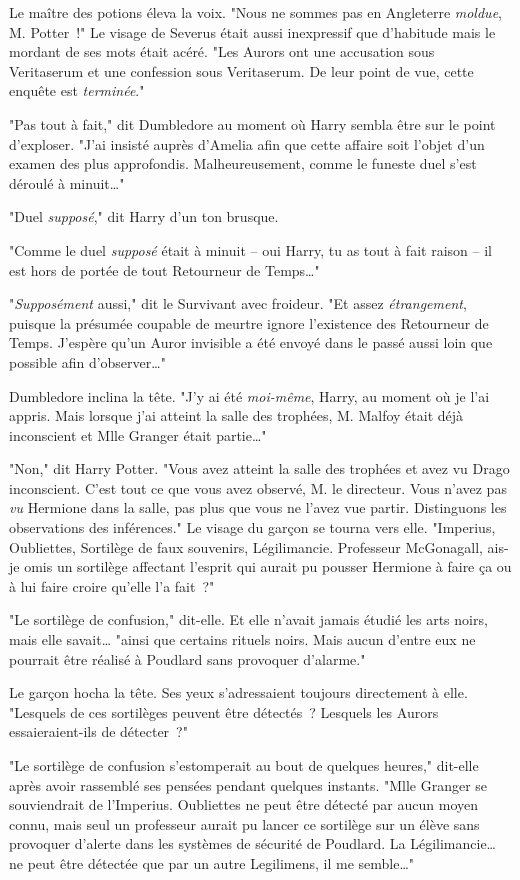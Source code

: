 Le maître des potions éleva la voix. "Nous ne sommes pas en Angleterre \emph{moldue}, M. Potter~!" Le visage de Severus était aussi inexpressif que d'habitude mais le mordant de ses mots était acéré. "Les Aurors ont une accusation sous Veritaserum et une confession sous Veritaserum. De leur point de vue, cette enquête est \emph{terminée}."

"Pas tout à fait," dit Dumbledore au moment où Harry sembla être sur le point d'exploser. "J'ai insisté auprès d'Amelia afin que cette affaire soit l'objet d'un examen des plus approfondis. Malheureusement, comme le funeste duel s'est déroulé à minuit…"

"Duel \emph{supposé}," dit Harry d'un ton brusque.

"Comme le duel \emph{supposé} était à minuit -- oui Harry, tu as tout à fait raison -- il est hors de portée de tout Retourneur de Temps…"

"\emph{Supposément} aussi," dit le Survivant avec froideur. "Et assez \emph{étrangement}, puisque la présumée coupable de meurtre ignore l'existence des Retourneur de Temps. J'espère qu'un Auror invisible a été envoyé dans le passé aussi loin que possible afin d'observer…"

Dumbledore inclina la tête. "J'y ai été \emph{moi-même}, Harry, au moment où je l'ai appris. Mais lorsque j'ai atteint la salle des trophées, M. Malfoy était déjà inconscient et Mlle Granger était partie…"

"Non," dit Harry Potter. "Vous avez atteint la salle des trophées et avez vu Drago inconscient. C'est tout ce que vous avez observé, M. le directeur. Vous n'avez pas \emph{vu} Hermione dans la salle, pas plus que vous ne l'avez vue partir. Distinguons les observations des inférences." Le visage du garçon se tourna vers elle. "Imperius, Oubliettes, Sortilège de faux souvenirs, Légilimancie. Professeur McGonagall, ais-je omis un sortilège affectant l'esprit qui aurait pu pousser Hermione à faire ça ou à lui faire croire qu'elle l'a fait~?"

"Le sortilège de confusion," dit-elle. Et elle n'avait jamais étudié les arts noirs, mais elle savait… "ainsi que certains rituels noirs. Mais aucun d'entre eux ne pourrait être réalisé à Poudlard sans provoquer d'alarme."

Le garçon hocha la tête. Ses yeux s'adressaient toujours directement à elle. "Lesquels de ces sortilèges peuvent être détectés~? Lesquels les Aurors essaieraient-ils de détecter~?"

"Le sortilège de confusion s'estomperait au bout de quelques heures," dit-elle après avoir rassemblé ses pensées pendant quelques instants. "Mlle Granger se souviendrait de l'Imperius. Oubliettes ne peut être détecté par aucun moyen connu, mais seul un professeur aurait pu lancer ce sortilège sur un élève sans provoquer d'alerte dans les systèmes de sécurité de Poudlard. La Légilimancie… ne peut être détectée que par un autre Legilimens, il me semble…"

